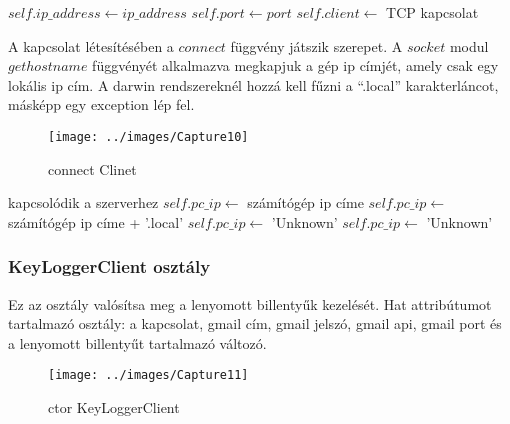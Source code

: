 \documentclass[a4paper, 11pt]{article}
\begin{document}
\begin{algorithmic}[H]
	\State $self.ip\_address \gets ip\_address$
	\State $self.port \gets port$
	\State $self.client \gets$ TCP kapcsolat
\EndFunction
\end{algorithmic}
A kapcsolat létesítésében a $connect$ függvény játszik szerepet. A $socket$ modul $gethostname$ függvényét alkalmazva megkapjuk a gép ip címjét, amely csak egy lokális ip cím. A darwin rendszereknél hozzá kell fűzni a ``.local'' karakterláncot, másképp egy exception lép fel.
\begin{figure}[H]
\centering
\texttt{[image: ../images/Capture10]}
\caption{connect Clinet}
\label{fig:connectclient}
\end{figure}

\begin{algorithmic}[H]
	\State kapcsolódik a szerverhez
	\try
		\State $self.pc\_ip \gets$ számítógép ip címe
		\try
			\State $self.pc\_ip \gets$ számítógép ip címe + '.local'
		\catch
			\State $self.pc\_ip \gets$ 'Unknown'
		\endtry
	\catch{}
		\State $self.pc\_ip \gets$ 'Unknown'
	\endtry
\EndFunction
\end{algorithmic}

\subsubsection{KeyLoggerClient osztály}\label{subsubsec:keyloggerclientclass}
Ez az osztály valósítsa meg a lenyomott billentyűk kezelését. Hat attribútumot tartalmazó osztály: a kapcsolat, gmail cím, gmail jelszó, gmail api, gmail port és a lenyomott billentyűt tartalmazó változó.
\begin{figure}[H]
\centering
\texttt{[image: ../images/Capture11]}
\caption{ctor KeyLoggerClient}
\label{fig:ctorkeyloggerclient}
\end{figure}
\end{document}
